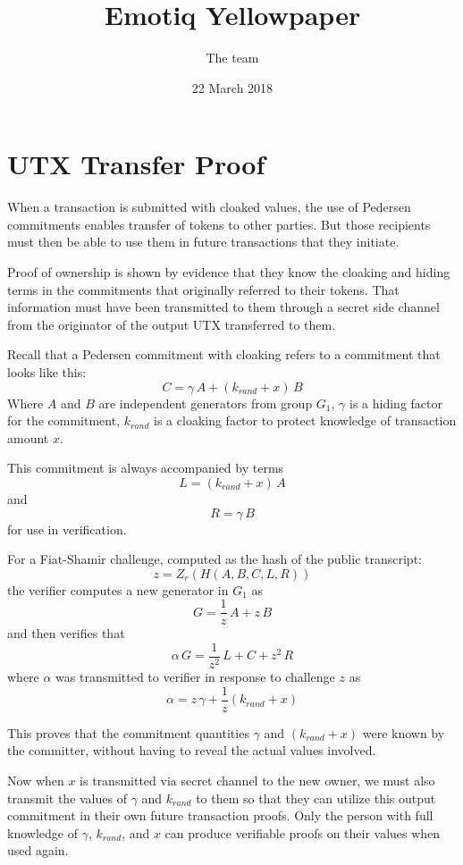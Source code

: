 \documentclass{yellowpaper}
\begin{document}
\title{Emotiq Yellowpaper}


\author{
\alignauthor
The team\\
}
\date{22 March 2018}

\maketitle

\section{UTX Transfer Proof}
When a transaction is submitted with cloaked values, the use of Pedersen commitments enables transfer of tokens to other parties. But those recipients must then be able to use them in future transactions that they initiate. 

Proof of ownership is shown by evidence that they know the cloaking and hiding terms in the commitments that originally referred to their tokens. That information must have been transmitted to them through a secret side channel from the originator of the output UTX transferred to them.

Recall that a Pedersen commitment with cloaking refers to a commitment that looks like this:
$$ C = \gamma \, A + (k_{rand} + x) \, B$$
Where $A$ and $B$ are independent generators from group $G_1$, $\gamma$ is a hiding factor for the commitment, $k_{rand}$ is a cloaking factor to protect knowledge of transaction amount $x$. 

This commitment is always accompanied by terms 
 $$L = (k_{rand} + x) \, A$$
 and 
$$R = \gamma \, B$$
  for use in verification. 
  
  For a Fiat-Shamir challenge, computed as the hash of the public transcript:
$$z = Z_r(H(A, B, C, L, R))$$
the verifier computes a new generator in $G_1$ as
$$G = \frac{1}{z} \, A + z\, B$$
and then verifies that
$$ \alpha \, G = \frac{1}{z^2} \, L + C + z^2\, R$$
where $\alpha$ was transmitted to verifier in response to challenge $z$ as
$$\alpha = z \, \gamma + \frac{1}{z} (k_{rand} + x)$$

This proves that the commitment quantities $\gamma$ and $(k_{rand} + x)$ were known by the committer, without having to reveal the actual values involved.

Now when $x$ is transmitted via secret channel to the new owner, we must also transmit the values of $\gamma$ and $k_{rand}$ to them so that they can utilize this output commitment in their own future transaction proofs. Only the person with full knowledge of $\gamma$, $k_{rand}$, and $x$ can produce verifiable proofs on their values when used again. 
\end{document}
